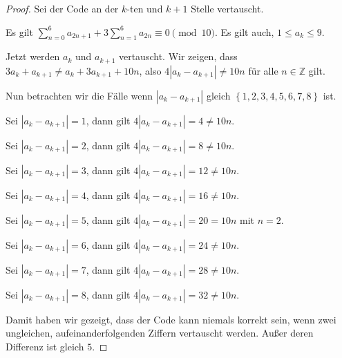 \documentclass[12pt]{extarticle}
\begin{document}
\begin{proof}
  Sei der Code an der \(k\)-ten und \(k+1\) Stelle vertauscht.

  Es gilt $\sum_{n=0}^6{a_{2n+1}}+3\sum_{n=1}^6{a_{2n}} \equiv 0
  \pmod{10}$.  Es gilt auch, \(1 \leq a_k \leq 9\).

Jetzt werden \(a_k\) und \(a_{k+1}\) vertauscht.  Wir zeigen, dass
\(3a_k+a_{k+1} \neq a_k+3a_{k+1}+10n\), also
\(4|a_k-a_{k+1}| \neq 10n\) für alle \(n \in \mathbb{Z}\)
gilt.

Nun betrachten wir die Fälle wenn
\(|a_k-a_{k+1}|\) gleich \(\left\{ 1,2,3,4,5,6,7,8 \right\}\) ist.

Sei \(|a_k-a_{k+1}|=1\), dann gilt \(4|a_k-a_{k+1}| =4 \neq 10n\).

Sei \(|a_k-a_{k+1}|=2\), dann gilt \(4|a_k-a_{k+1}| =8 \neq 10n\).

Sei \(|a_k-a_{k+1}|=3\), dann gilt \(4|a_k-a_{k+1}| =12 \neq 10n\).

Sei \(|a_k-a_{k+1}|=4\), dann gilt \(4|a_k-a_{k+1}| =16 \neq 10n\).

Sei \(|a_k-a_{k+1}|=5\), dann gilt $4|a_k-a_{k+1}| =20 =
10n$ mit \(n=2\).

Sei \(|a_k-a_{k+1}|=6\), dann gilt \(4|a_k-a_{k+1}| =24 \neq 10n\).

Sei \(|a_k-a_{k+1}|=7\), dann gilt \(4|a_k-a_{k+1}| =28 \neq 10n\).

Sei \(|a_k-a_{k+1}|=8\), dann gilt \(4|a_k-a_{k+1}| =32 \neq 10n\).

Damit haben wir gezeigt, dass der Code kann niemals korrekt sein, wenn
zwei ungleichen, aufeinanderfolgenden Ziffern vertauscht werden.
Außer deren Differenz ist gleich \(5\).

\end{proof}
\end{document}
